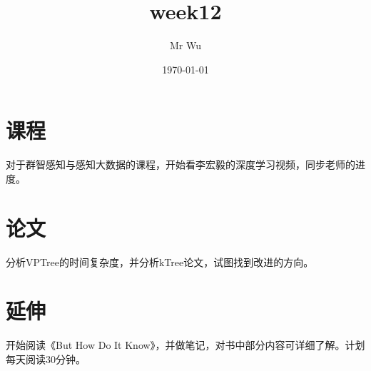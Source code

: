 \documentclass{ctexart}
\title{week12}
\author{Mr Wu}
\date{\today}
\begin{document}
	\section{课程}
	对于群智感知与感知大数据的课程，开始看李宏毅的深度学习视频，同步老师的进度。
	\section{论文}
	分析VPTree的时间复杂度，并分析kTree论文，试图找到改进的方向。
	\section{延伸}
	开始阅读《But How Do It Know》，并做笔记，对书中部分内容可详细了解。计划每天阅读30分钟。
\end{document}
